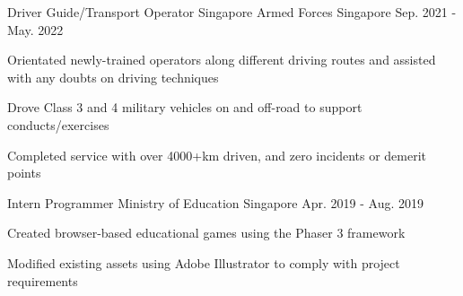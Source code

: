 \begin{cventries}
  \cventry
    {Driver Guide/Transport Operator} %
    {Singapore Armed Forces} %
    {Singapore} %
    {Sep. 2021 - May. 2022} %
    {
      \begin{cvitems} %
        \item {Orientated newly-trained operators along different driving routes and assisted with any doubts on driving techniques}
        \item {Drove Class 3 and 4 military vehicles on and off-road to support conducts/exercises}
        \item {Completed service with over 4000+km driven, and zero incidents or demerit points}
      \end{cvitems}
    }

  \cventry
    {Intern Programmer} %
    {Ministry of Education} %
    {Singapore} %
    {Apr. 2019 - Aug. 2019} %
    {
      \begin{cvitems} %
        \item {Created browser-based educational games using the Phaser 3 framework}
        \item {Modified existing assets using Adobe Illustrator to comply with project requirements}
      \end{cvitems}
    }
\end{cventries}
